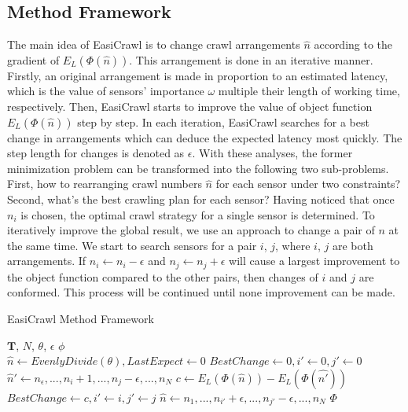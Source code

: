 \documentclass[conference]{IEEEtran}
\begin{document}
\subsection{Method Framework}
The main idea of EasiCrawl is to change crawl arrangements $\hat{n}$ according to the gradient of $E_L(\Phi(\hat{n}))$.
This arrangement is done in an iterative manner.
Firstly, an original arrangement is made in proportion to an estimated latency, which is the value of sensors' importance $\omega$ multiple their length of working time, respectively.
Then, EasiCrawl starts to improve the value of object function $E_L(\Phi(\hat{n}))$ step by step. 
In each iteration, EasiCrawl searches for a best change in arrangements which can deduce the expected latency most quickly.
The step length for changes is denoted as $\epsilon$.
With these analyses, the former minimization problem can be transformed into the following two sub-problems.
First, how to rearranging crawl numbers $\hat{n}$ for each sensor under two constraints? 
Second, what's the best crawling plan for each sensor? 
Having noticed that once $n_i$ is chosen, the optimal crawl strategy for a single sensor is determined. 
To iteratively improve the global result, we use an approach to change a pair of $n$ at the same time.
We start to search sensors for a pair $i$, $j$, where $i$, $j$ are both arrangements. 
If $n_i\gets n_i-\epsilon$ and $n_j\gets n_j+\epsilon$ will cause a largest improvement to the object function compared to the other pairs, then changes of $i$ and $j$ are conformed. 
This process will be continued until none improvement can be made. 

\begin{algorithm}
	\caption{EasiCrawl Method Framework}
	\label{alg:framework}
	\begin{algorithmic}[1]
		\renewcommand{\algorithmicrequire}{\textbf{Input:}}
		\renewcommand{\algorithmicensure}{\textbf{Output:}}
		\REQUIRE $\mathbf{T}$, $N$, $\theta$, $\epsilon$
		\ENSURE  $\phi$
		\\ 
		\STATE $\hat{n}\gets EvenlyDivide(\theta), LastExpect\gets 0$
		\STATE $BestChange \gets 0, i'\gets 0, j'\gets 0$		
		\STATE $\hat{n}'\gets n_\epsilon,...,n_i+1,...,n_j-\epsilon,...,n_N$
		\STATE $c\gets E_L(\Phi(\hat{n})) - E_L(\Phi(\hat{n'}))$
		\STATE $BestChange \gets c, i'\gets i, j'\gets j$
		\ENDIF
		\ENDFOR
		\STATE $\hat{n}\gets n_1,...,n_{i'}+\epsilon,...,n_{j'}-\epsilon,...,n_N$
		\ENDWHILE 
		\RETURN $\Phi$
	\end{algorithmic} 
\end{algorithm}
\end{document}
